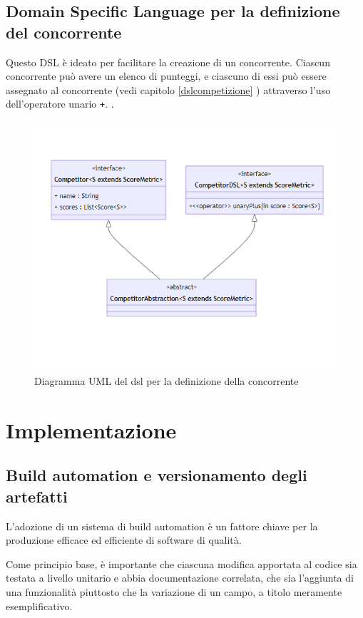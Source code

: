\documentclass[12pt,a4paper,openright,twoside]{book}
\begin{document}
\section{Domain Specific Language per la definizione del concorrente}
Questo DSL è ideato per facilitare la creazione di un concorrente.
Ciascun concorrente può avere un elenco di punteggi, e ciascuno di essi può essere
assegnato al concorrente (vedi capitolo \ref{dslcompetizione} ) attraverso l'uso dell'operatore unario \texttt{+}. .
\begin{figure}[H]
    \centering
     \includegraphics[width=1.1\linewidth]{figures/competitorDSL.png}
     \caption{Diagramma UML del \ac{dsl} per la definizione della concorrente}
    \label{fig:competitorDSL}
 \end{figure}
 \newpage

\chapter{Implementazione}

\section{Build automation e versionamento degli artefatti}
L'adozione di un sistema di build automation è un fattore chiave per la produzione
efficace ed efficiente di software di qualità.

Come principio base, è importante che ciascuna modifica apportata al codice
sia testata a livello unitario e abbia documentazione correlata, che sia l'aggiunta 
di una funzionalità piuttosto che la variazione di un campo, a titolo meramente
esemplificativo. 
\end{document}
